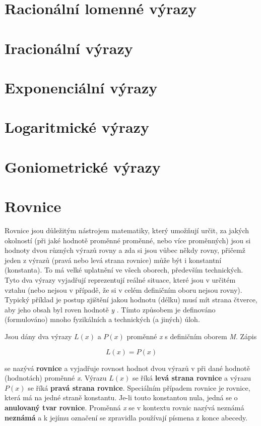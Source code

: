 \documentclass[11pt]{article}
\begin{document}
\section{Racionální lomenné výrazy}

\section{Iracionální výrazy}

\section{Exponenciální výrazy}

\section{Logaritmické výrazy}

\section{Goniometrické výrazy}

\section{Rovnice}

Rovnice jsou důležitým nástrojem matematiky, který umožňují určit, za jakých okolností (při jaké hodnotě proměnné proměnné, nebo více proměnných) jsou si hodnoty dvou různých výrazů rovny a zda si jsou vůbec někdy rovny, přičemž jeden z výrazů (pravá nebo levá strana rovnice) může být i konstantní (konstanta). To má velké uplatnění ve všech oborech, především technických. Tyto dva výrazy vyjadřují reprezentují reálné situace, které jsou v určitém vztahu (nebo nejsou v případě, že si v celém definičním oboru nejsou rovny). Typický příklad je postup zjištění jakou hodnotu (délku) musí mít strana čtverce, aby jeho obsah byl roven hodnotě {\it y} . Tímto způsobem je definováno (formulováno) mnoho fyzikálních a technických (a jiných) úloh. 

Jsou dány dva výrazy $L(x)$ a $P(x)$ proměnné {\it x} s definičním oborem {\it M}. Zápis 

$$ L(x) = P(x) $$

se nazývá {\bf rovnice} a vyjadřuje rovnost hodnot dvou výrazů v při dané hodnotě (hodnotách) proměnné {\it x}. Výrazu $L(x)$ se říká {\bf levá strana rovnice} a výrazu $P(x)$ se říká {\bf pravá strana rovnice}. Speciálním případem rovnice je rovnice, která má na jedné straně konstantu. Je-li touto konstantou nula, jedná se o {\bf anulovaný tvar rovnice}. Proměnná {\it x} se v kontextu rovnic nazývá neznámá {\bf neznámá} a k jejímu označení se zpravidla používají písmena z konce abecedy.
\end{document}
